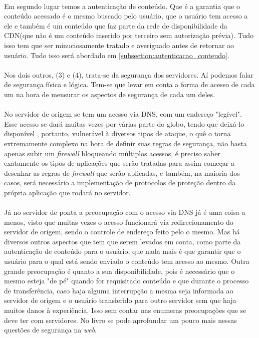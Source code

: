 \paragraph{}
Em segundo lugar temos a autentica\c{c}\~ao de conte\'udo. Que \'e a garantia que o conte\'udo acessado \'e o mesmo buscado pelo usu\'ario, que o usu\'ario tem acesso a ele e tamb\'em \'e um conte\'udo que faz parte da rede de disponibilidade da CDN(que n\~ao \'e um conte\'udo inserido por terceiro sem autoriza\c{c}\~ao pr\'evia). Tudo isso tem que ser minuciosamente tratado e averiguado antes de retornar ao usu\'ario. Tudo isso ser\'a abordado em \ref{subsection:autenticacao_conteudo}.
\paragraph{}
Nos dois outros, (3) e (4), trata-se da seguran\c{c}a dos servidores. A\'i podemos falar de seguran\c{c}a f\'isica e l\'ogica. Tem-se que levar em conta a forma de acesso de cada um na hora de mensurar os aspectos de seguran\c{c}a de cada um deles. 
\paragraph{}
No servidor de origem se tem um acesso via DNS, com um endereço "leg\'ivel". Esse acesso se dar\'a muitas vezes por v\'arias parte do globo, tendo que deix\'a-lo dispon\'ivel , portanto, vulner\'avel \`a diversos tipos de ataque, o qu\^e o torna extremamente complexo na hora de definir suas regras de seguran\c{c}a, n\~ao basta apenas subir um \textit{firewall} bloqueando m\'ultiplos acessos, \'e preciso saber exatamente os tipos de aplica\c{c}\~oes que ser\~ao tratadas para assim come\c{c}ar a desenhar as regras de \textit{firewall} que ser\~ao aplicadas, e tamb\'em, na maioria dos casos, ser\'a necess\'ario a implementa\c{c}\~ao de protocolos de prote\c{c}\~ao dentro da pr\'opria aplica\c{c}\~ao que rodar\'a no servidor.
\paragraph{}
J\'a no servidor de ponta a preocupa\c{c}\~ao com o acesso via DNS j\'a \'e uma coisa a menos, visto que muitas vezes o acesso funcionar\'a via redirecionamento do servidor de origem, sendo o controle de endere\c{c}o feito pelo o mesmo. Mas h\'a diversos outros aspectos que tem que serem levados em conta, como parte da autentica\c{c}\~ao de conte\'udo para o usu\'ario, que nada mais \'e que garantir que o usu\'ario para o qual est\'a sendo enviado o conte\'udo tem acesso ao mesmo. Outra grande preocupa\c{c}\~ao \'e quanto a sua disponibilidade, pois \'e necess\'ario que o mesmo esteja "de p\'e" quando for requisitado conte\'udo e que durante o processo de transfer\^encia, caso haja alguma interrup\c{c}\~ao a mesma seja informada ao servidor de origem e o usu\'ario transferido para outro servidor sem que haja muitos danos \`a experi\^encia. Isso sem contar nas enumeras preocupa\c{c}\~oes que se deve ter com servidores. No livro \cite{stallings1995network} se pode aprofundar um pouco mais nessas quest\~oes de seguran\c{c}a na \textit{web}.
